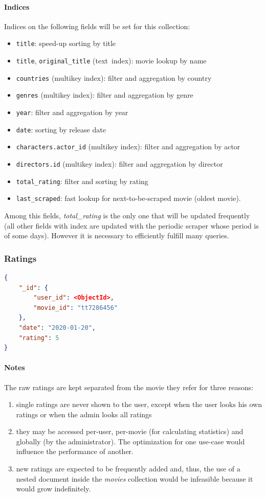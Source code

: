 \documentclass[11pt]{article}
\begin{document}
\paragraph{Indices} 
Indices on the following fields will be set for this collection:
\begin{itemize}
	\item \texttt{title}: speed-up sorting by title
	\item \texttt{title}, \texttt{original\_title} (text\ index): movie lookup 
			by name
	\item \texttt{countries} (multikey index): filter and aggregation by country
	\item \texttt{genres} (multikey index): filter and aggregation by genre
	\item \texttt{year}: filter and aggregation by year
	\item \texttt{date}: sorting by release date
	\item \texttt{characters.actor\_id} (multikey index): filter and aggregation by actor
	\item \texttt{directors.id} (multikey index): filter and aggregation by director
	\item \texttt{total\_rating}: filter and sorting by rating
	\item \texttt{last\_scraped}: fast lookup for next-to-be-scraped movie (oldest movie).
\end{itemize}

Among this fields, \emph{total\_rating} is the only one that will be updated 
frequently (all other fields with index are updated with the periodic scraper 
whose period is of some days). However it is necessary to efficiently fulfill 
many queries.

\subsubsection{Ratings}
\label{sec:ratings}

\begin{lstlisting}[language=json]	
{
	"_id": {
		"user_id": <ObjectId>,
		"movie_id": "tt7286456"
	},
	"date": "2020-01-20",
	"rating": 5
}
\end{lstlisting}

\paragraph{Notes}
The raw ratings are kept separated from the movie they refer for three reasons:
\begin{enumerate}
	\item single ratings are never shown to the user, except when the user 
			looks his own ratings or when the admin looks all ratings	
	\item they may be accessed per-user, per-movie (for calculating 	
			statistics) and globally (by the administrator). The optimization for one use-case would influence the performance of another.
	\item new ratings are expected to be frequently added and, thus, the use of 
		a nested document inside the \emph{movies} collection would be 
		infeasible because it would grow indefinitely. 
\end{enumerate} 
\end{document}
